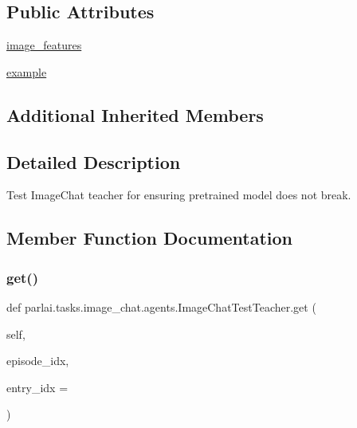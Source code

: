 \subsection*{Public Attributes}
\begin{DoxyCompactItemize}
\item 
\hyperlink{classparlai_1_1tasks_1_1image__chat_1_1agents_1_1ImageChatTestTeacher_a80425539c895043b514564eb38961bf6}{image\+\_\+features}
\item 
\hyperlink{classparlai_1_1tasks_1_1image__chat_1_1agents_1_1ImageChatTestTeacher_a7a723dab72ffcb3a7b39d0548fec9e79}{example}
\end{DoxyCompactItemize}
\subsection*{Additional Inherited Members}


\subsection{Detailed Description}
\begin{DoxyVerb}Test ImageChat teacher for ensuring pretrained model does not break.
\end{DoxyVerb}
 

\subsection{Member Function Documentation}
\mbox{\label{classparlai_1_1tasks_1_1image__chat_1_1agents_1_1ImageChatTestTeacher_a62eff78b8f32b86c39804a644c3337f6}} 
\subsubsection{\texorpdfstring{get()}{get()}}
{\footnotesize\ttfamily def parlai.\+tasks.\+image\+\_\+chat.\+agents.\+Image\+Chat\+Test\+Teacher.\+get (\begin{DoxyParamCaption}\item[{}]{self,  }\item[{}]{episode\+\_\+idx,  }\item[{}]{entry\+\_\+idx = {} }\end{DoxyParamCaption})}

